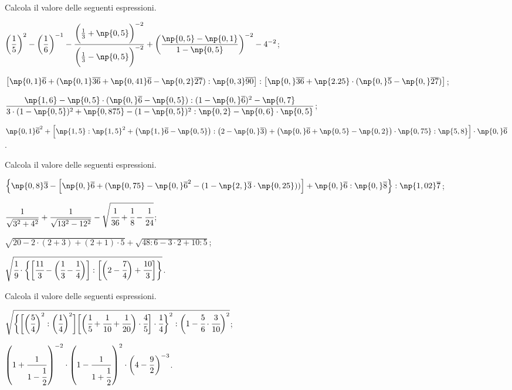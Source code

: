\begin{esercizio}[\Ast]%
 Calcola il valore delle seguenti espressioni.
\begin{enumeratea}
\spazielenx
\item $\displaystyle{\bigg(\frac{1}{5}\bigg)^{2}-\bigg(\frac{1}{6}\bigg)^{-1}-\frac{\bigg(\frac{1}{3}+\np{0,5}\bigg)^{-2}}%
{\bigg(\frac{1}{3}-\np{0,5}\bigg)^{-2}}+\bigg(\frac{\np{0,5}-\np{0,1}}{1-\np{0,5}}\bigg)^{-2}-4^{-2}}$;
\item $\displaystyle{\left[\np{0,1}\overline{6}+(\np{0,1}\overline{36}+\np{0,41}\overline{6}-\np{0,2}\overline{27}):\np{0,3}\overline{90}\right]:%
\left[\np{0,}\overline{36}+\np{2.25}\cdot(\np{0,}\overline{5}-\np{0,}\overline{27})\right]}$;
\item $\displaystyle{\frac{\np{1,6}-\np{0,5}\cdot(\np{0,}\overline{6}-\np{0,5}):(1-\np{0,}\overline{6})^{2}-\np{0,7}}%
{3\cdot(1-\np{0,5})^{2}+\np{0,875}-(1-\np{0,5})^{2}:\np{0,2}-\np{0,6}\cdot\np{0,5}}}$;
\item $\displaystyle{{\np{0,1}\overline{{6}}}^{2}+\left[\np{1,5}:\np{1,5}^{2}+\left(\np{1,}\overline{6}-\np{0,5}\right):\left(2-\np{0,}\overline{3}\right)%
+\left(\np{0,}\overline{{6}}+\np{0,5}-\np{0,2}\right)\cdot\np{0,75}:\np{5,8}\right]\cdot \np{0,}\overline{{6}}}$.
\end{enumeratea}
\end{esercizio}
\pagebreak
\begin{esercizio}[\Ast]%
 Calcola il valore delle seguenti espressioni.
\begin{enumeratea}
\spazielenx
\item $\displaystyle{\left\{\np{0,8}\overline{3}-\left[\np{0,}\overline{6}+(\np{0,75}-{\np{0,}\overline{6}}^{2}-(1-\np{2,}\overline{3}\cdot%
\np{0,25}))\right]+\np{0,}\overline{6}:\np{0,}\overline{8}\right\}:\np{1,02}\overline{7}}$;
\item $\displaystyle{\frac{1}{\sqrt{3^{2}+4^{2}}}+\frac{1}{\sqrt{13^{2}-12^2}}-\sqrt{\cfrac{1}{36}+\cfrac{1}{8}%
-\cfrac{1}{24}}}$;
\item $\displaystyle{\sqrt{20-2\cdot(2+3)+(2+1)\cdot5}+\sqrt{48:6-3\cdot2+10:5}}$;
\item $\displaystyle{\sqrt{\cfrac{1}{9}\cdot\bigg\{\bigg[\cfrac{11}{3}-\bigg(\cfrac{1}{3}-\cfrac{1}{4}\bigg)\bigg]:%
\bigg[\bigg(2-\cfrac{7}{4}\bigg)+\cfrac{10}{3}\bigg]\bigg\}}}$.
\end{enumeratea}
\end{esercizio}

\begin{esercizio}[\Ast]%
 Calcola il valore delle seguenti espressioni.
\begin{enumeratea}
\spazielenx
\item $\displaystyle{\sqrt{\bigg\{\bigg[\bigg(\cfrac{5}{4}\bigg)^{2}:\bigg(\cfrac{1}{4}\bigg)^{2}\bigg]%
\bigg[\bigg(\cfrac{1}{5}+\cfrac{1}{10}+\cfrac{1}{20}\bigg)\cdot\cfrac{4}{5}\bigg]\cdot\cfrac{1}{4}\bigg\}^{2}%
:\bigg(1-\cfrac{5}{6}\cdot\cfrac{3}{10}\bigg)^{2}}}$;
\item $\displaystyle{\left(1+\frac{1}{1-\cfrac{1}{2}}\right)^{-2}\cdot\left(1-\frac{1}{1+\cfrac{1}{2}}\right)^{2}\cdot%
\bigg(4-\frac{9}{2}\bigg)^{-3}}$.
\end{enumeratea}
\end{esercizio}

